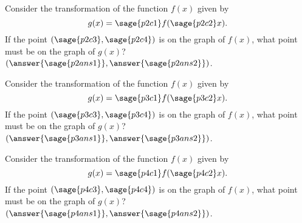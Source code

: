 \documentclass{ximera}
\begin{document}
\begin{problem}
    Consider the transformation of the function $f(x)$ given by 
    \[
        g(x) = \sage{p2c1}f( \sage{p2c2}x ).
    \] 
    If the point $(\sage{p2c3}, \sage{p2c4})$ is on the graph of $f(x)$, what point must be on the graph of $g(x)$? $(\answer{\sage{p2ans1}},\answer{\sage{p2ans2}})$.
\end{problem}

\begin{problem}
    Consider the transformation of the function $f(x)$ given by 
    \[
        g(x) = \sage{p3c1}f( \sage{p3c2}x ).
    \] 
    If the point $(\sage{p3c3}, \sage{p3c4})$ is on the graph of $f(x)$, what point must be on the graph of $g(x)$? $(\answer{\sage{p3ans1}},\answer{\sage{p3ans2}})$.
\end{problem}

\begin{problem}
    Consider the transformation of the function $f(x)$ given by 
    \[
        g(x) = \sage{p4c1}f( \sage{p4c2}x ).
    \] 
    If the point $(\sage{p4c3}, \sage{p4c4})$ is on the graph of $f(x)$, what point must be on the graph of $g(x)$? $(\answer{\sage{p4ans1}},\answer{\sage{p4ans2}})$.
\end{problem}
\end{document}
